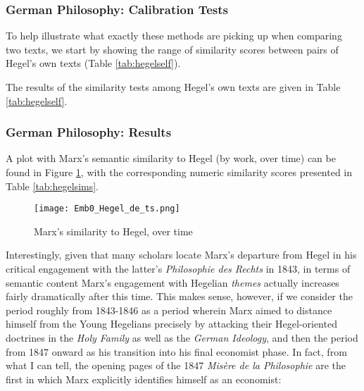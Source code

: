 \subsubsection{German Philosophy: Calibration Tests}

To help illustrate what exactly these methods are picking up when comparing two texts, we start by showing the range of similarity scores between pairs of Hegel's own texts (Table \ref{tab:hegelself}).


The results of the similarity tests among Hegel's own texts are given in Table \ref{tab:hegelself}. 






\subsubsection{German Philosophy: Results}

A plot with Marx's semantic similarity to Hegel (by work, over time) can be found in Figure \ref{fig:hegelsims}, with the corresponding numeric similarity scores presented in Table \ref{tab:hegelsims}.



\begin{figure}[ht!]
    \texttt{[image: Emb0\_Hegel\_de\_ts.png]}
    \caption{Marx's similarity to Hegel, over time}
    \label{fig:hegelsims}
\end{figure}

Interestingly, given that many scholars locate Marx's departure from Hegel in his critical engagement with the latter's \textit{Philosophie des Rechts} in 1843, in terms of semantic content Marx's engagement with Hegelian \textit{themes} actually increases fairly dramatically after this time. This makes sense, however, if we consider the period roughly from 1843-1846 as a period wherein Marx aimed to distance himself from the Young Hegelians precisely by attacking their Hegel-oriented doctrines in the \textit{Holy Family} as well as the \textit{German Ideology}, and then the period from 1847 onward as his transition into his final economist phase. In fact, from what I can tell, the opening pages of the 1847 \textit{Misère de la Philosophie} are the first in which Marx explicitly identifies himself as an economist:

